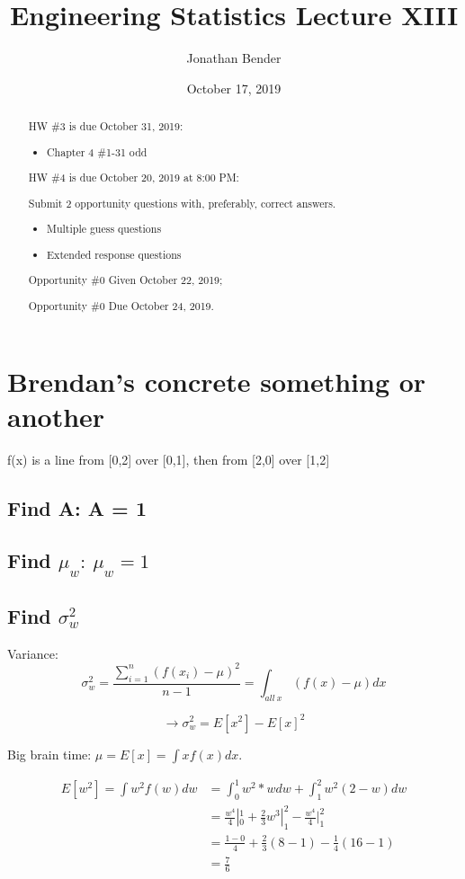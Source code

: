 \documentclass[]{article}
\title{Engineering Statistics Lecture XIII}
\author{Jonathan Bender}
\date{October 17, 2019}
\begin{document}
	
	\maketitle
	
	\begin{abstract}	
		HW \#3 is due October 31, 2019:
		\begin{itemize}
			\item Chapter 4 \#1-31 odd
		\end{itemize}
	
		HW \#4 is due October 20, 2019 at 8:00 PM:
		
		Submit 2 opportunity questions with, preferably, correct answers.
		\begin{itemize}
			\item Multiple guess questions
			\item Extended response questions
		\end{itemize}
	
		Opportunity \#0 Given October 22, 2019;
		
		Opportunity \#0 Due October 24, 2019.
	\end{abstract}
	
	\section{Brendan's concrete something or another}
	f(x) is a line from [0,2] over [0,1], then from [2,0] over [1,2]
	\subsection{Find A: A = 1}
	\subsection{Find $\mu_w:\ \mu_w = 1$}
	
	
	\pagebreak
	\subsection{Find $\sigma_w^2$}
	Variance: $$ \sigma_w^2 = \dfrac{\sum_{i=1}^{n}(f(x_i) - \mu)^2}{n-1} = \int_{all\ x}(f(x) - \mu)dx$$
	
	$$\to \sigma_w^2 = E[x^2] - E[x]^2$$
	
	Big brain time: $\mu = E[x] = \int xf(x)dx$.
	
	\begin{align*}
	E[w^2] = \int w^2f(w)dw &= \int_0^1 w^2*wdw + \int_1^2 w^2(2-w)dw \\
	&= \frac{w^4}{4}|_0^1 + \frac{2}{3}w^3|_1^2 - \frac{w^4}{4}|_1^2\\
	&= \frac{1-0}{4} + \frac{2}{3}(8-1) - \frac{1}{4}(16 - 1)\\
	&= \frac{7}{6}
	\end{align*}
	
\end{document}
